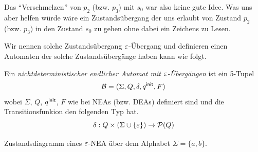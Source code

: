 Das ``Verschmelzen'' von $p_2$ (bzw. $p_3$) mit $s_0$ war also keine gute Idee.
Was uns aber helfen würde wäre ein Zustandsübergang der uns erlaubt von Zustand $p_2$ (bzw. $p_3$) in den Zustand $s_0$ zu gehen ohne dabei ein Zeichens zu Lesen.

Wir nennen solche Zustandsübergang $\varepsilon$-Übergang und definieren einen Automaten der solche Zustandsübergänge haben kann wie folgt.

\begin{Def}
        Ein \emph{nichtdeterministischer endlicher Automat mit $\varepsilon$-Übergängen} ist ein 5-Tupel
        \[ \mathcal{B}= (\Sigma, Q,\delta,{q^\mathsf{init}},F) \]
wobei $\Sigma$, $Q$, ${q^\mathsf{init}}$, $F$ wie bei NEAs (bzw. DEAs) definiert sind und die Transitionsfunkion den folgenden Typ hat.
$$ \delta:Q\x(\Sigma\cup\{\Eps\})\->\mathcal{P}(Q)$$
\end{Def}

\begin{Bsp} Zustandsdiagramm eines $\varepsilon$-NEA über dem Alphabet $\Sigma=\{a,b\}$.
   \begin{center}
   \end{center}
\end{Bsp}

